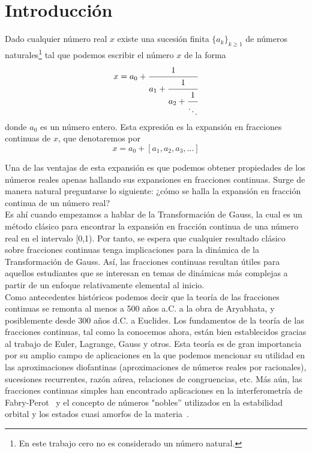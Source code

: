 \documentclass[12pt]{report}
\begin{document}
\renewcommand{\thepage}{\arabic{page}}
\setcounter{page}{1}



\chapter*{Introducción}

Dado cualquier número real $x$ existe una sucesión finita $\{a_{k}\}_{k\geq1}$ de números naturales\footnote{En este trabajo cero no es considerado un número natural.} tal que podemos escribir el número $x$ de la forma
$$
x = a_{0} + \cfrac{1}{a_{1} + \cfrac{1}{a_{2} +\cfrac{1}{\ddots}}}
$$
donde $a_{0}$ es un número entero. Esta expresión es la expansión en fracciones continuas de $x$, que denotaremos por
$$
x=a_{0}+[a_{1},a_{2},a_{3},\ldots]
$$

Una de las ventajas de esta expansión es que podemos obtener propiedades de los números reales apenas hallando sus expansiones en fracciones continuas. Surge de manera natural preguntarse lo siguiente: ¿cómo se halla la expansión en fracción continua de un número real?
\\

Es ahí cuando empezamos a hablar de la Transformación de Gauss, la cual es un método clásico para encontrar la expansión en fracción continua de una número real en el intervalo [0,1). Por tanto, se espera que cualquier resultado clásico sobre fracciones continuas tenga implicaciones para la dinámica de la Transformación de Gauss. Así, las fracciones continuas resultan útiles para aquellos estudiantes que se interesan en temas de dinámicas más complejas a partir de un enfoque relativamente elemental al inicio.
\\

Como antecedentes históricos podemos decir que la teoría de las fracciones continuas se remonta al menos a 500 años a.C. a la obra de Aryabhata, y posiblemente desde 300 años d.C. a Euclides. Los fundamentos de la teoría de las fracciones continuas, tal como la conocemos ahora, están bien establecidos gracias al trabajo de Euler, Lagrange, Gauss y otros. Esta teoría es de gran importancia por su amplio campo de aplicaciones en la que podemos mencionar su utilidad en las aproximaciones diofantinas (aproximaciones de números reales por racionales), sucesiones recurrentes, razón aúrea, relaciones de congruencias, etc. Más aún, las fracciones continuas simples han encontrado aplicaciones en la interferometría de Fabry-Perot~\cite{Ikeda} y el concepto de números "nobles'' utilizados en la estabilidad orbital y los estados cuasi amorfos de la materia~\cite{Sch}.
\\
\end{document}
